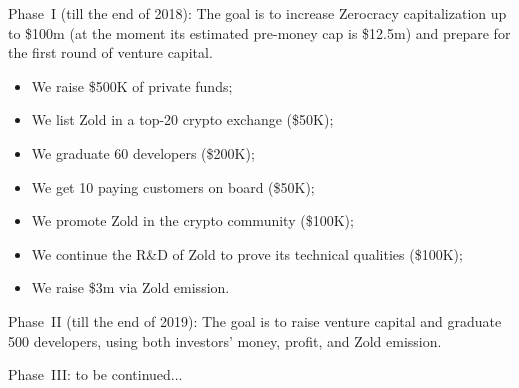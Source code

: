 \documentclass{main}
\begin{document}
Phase~I (till the end of 2018): The goal is to increase Zerocracy capitalization
up to \$100m (at the moment its estimated pre-money cap is \$12.5m) and prepare for
the first round of venture capital.

\begin{itemize}\itemsep0em
  \item We raise \$500K of private funds;
  \item We list Zold in a top-20 crypto exchange (\$50K);
  \item We graduate 60 developers (\$200K);
  \item We get 10 paying customers on board (\$50K);
  \item We promote Zold in the crypto community (\$100K);
  \item We continue the R\&D of Zold to prove its technical qualities (\$100K);
  \item We raise \$3m via Zold emission.
\end{itemize}

Phase~II (till the end of 2019): The goal is to raise venture capital and
graduate 500 developers, using both investors' money, profit, and Zold emission.

Phase~III: to be continued...
\end{document}
